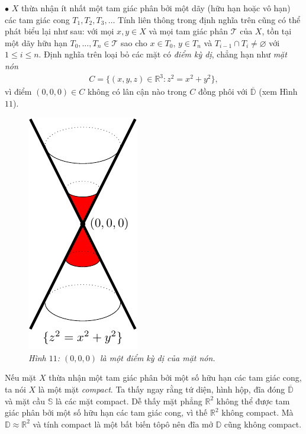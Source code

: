 \begin{multicols}{2}
	\vskip 0.1cm
	$\bullet$ $X$ thừa nhận ít nhất một tam giác phân bởi một dãy (hữu hạn hoặc vô hạn) các tam giác cong $T_1,T_2,T_3,\ldots$
	\vskip 0.1cm
	Tính liên thông trong định nghĩa trên cũng có thể phát biểu lại như sau: với mọi $x,y \in X$ và mọi tam giác phân $\mathscr{T}$ của $X$, tồn tại một dãy hữu hạn $T_0,\ldots,T_n \in \mathscr{T}$ sao cho $x \in T_0$, $y \in T_n$ và $T_{i-1} \cap T_i \neq \varnothing$ với $1 \le i \le n$. 
	\vskip 0.1cm
	Định nghĩa trên loại bỏ các mặt có {\it điểm kỳ dị}, chẳng hạn như {\it mặt nón}
	\begin{align*}
		C = \{(x,y,z) \in \mathbb{R}^3: z^2 = x^2 + y^2\},
	\end{align*}
	vì điểm $(0,0,0) \in C$ không có lân cận nào trong $C$ đồng phôi với $\overline{\mathbb{D}}$ (xem Hình $11$).
	\begin{figure}[H]
		\vspace*{-5pt}
		\centering\captionsetup{labelformat=empty, justification=centering}
		\includegraphics[width=0.35\linewidth]{H11.pdf}
		\caption{\small\textit{\color{duongvaotoanhoc}Hình $11$: $(0,0,0)$ là một điểm kỳ dị của mặt nón.}}
		\vspace*{-10pt}
	\end{figure}
	Nếu mặt $X$ thừa nhận một tam giác phân bởi một số hữu hạn các tam giác cong, ta nói $X$ là một mặt {\it compact}. Ta thấy ngay rằng tứ diện, hình hộp, đĩa đóng $\overline{\mathbb{D}}$ và mặt cầu $\mathbb{S}$ là các mặt compact. Dễ thấy mặt phẳng $\mathbb{R}^2$ không thể được tam giác phân bởi một số hữu hạn các tam giác cong, vì thế $\mathbb{R}^2$ không compact. Mà $\mathbb{D} \approx \mathbb{R}^2$ và tính compact là một bất biến tôpô nên đĩa mở $\mathbb{D}$ cũng không compact.

\end{multicols}
